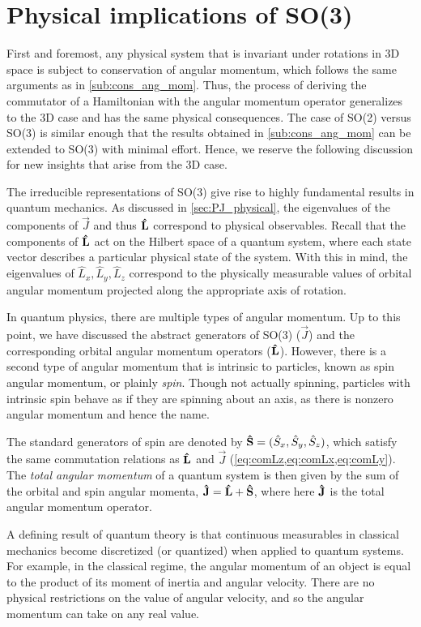 \section{Physical implications of SO(3)}\label{sec:phys_SO3}
First and foremost, any physical system that is invariant under rotations in 3D space is subject to conservation of angular momentum, which follows the same arguments as in \cref{sub:cons_ang_mom}. Thus, the process of deriving the commutator of a Hamiltonian with the angular momentum operator generalizes to the 3D case and has the same physical consequences. The case of SO(2) versus SO(3) is similar enough that the results obtained in \cref{sub:cons_ang_mom} can be extended to SO(3) with minimal effort. Hence, we reserve the following discussion for new insights that arise from the 3D case.

The irreducible representations of SO(3) give rise to highly fundamental results in quantum mechanics. As discussed in \cref{sec:PJ_physical}, the eigenvalues of the components of $\vec{J}$ and thus $\mathbf{\hat{L}}$ correspond to physical observables. Recall that the components of $\mathbf{\hat{L}}$ act on the Hilbert space of a quantum system, where each state vector describes a particular physical state of the system. With this in mind, the eigenvalues of $\hat{L}_x, \hat{L}_y, \hat{L}_z$ correspond to the physically measurable values of orbital angular momentum projected along the appropriate axis of rotation.

In quantum physics, there are multiple types of angular momentum. Up to this point, we have discussed the abstract generators of SO(3) ($\vec{J}$) and the corresponding orbital angular momentum operators ($\mathbf{\hat{L}}$). However, there is a second type of angular momentum that is intrinsic to particles, known as spin angular momentum, or plainly \textit{spin}. Though not actually spinning, particles with intrinsic spin behave as if they are spinning about an axis, as there is nonzero angular momentum and hence the name.

The standard generators of spin are denoted by $\mathbf{\hat{S}} = (\hat{S}_x,\hat{S}_y,\hat{S}_z)$, which satisfy the same commutation relations as $\mathbf{\hat{L}}$ and $\vec{J}$ (\cref{eq:comLz,eq:comLx,eq:comLy}). The \textit{total angular momentum} of a quantum system is then given by the sum of the orbital and spin angular momenta, $\mathbf{\hat{J}} = \mathbf{\hat{L}} + \mathbf{\hat{S}}$, where here $\mathbf{\hat{J}}$ is the total angular momentum operator.

A defining result of quantum theory is that continuous measurables in classical mechanics become discretized (or quantized) when applied to quantum systems. For example, in the classical regime, the angular momentum of an object is equal to the product of its moment of inertia and angular velocity. There are no physical restrictions on the value of angular velocity, and so the angular momentum can take on any real value.

